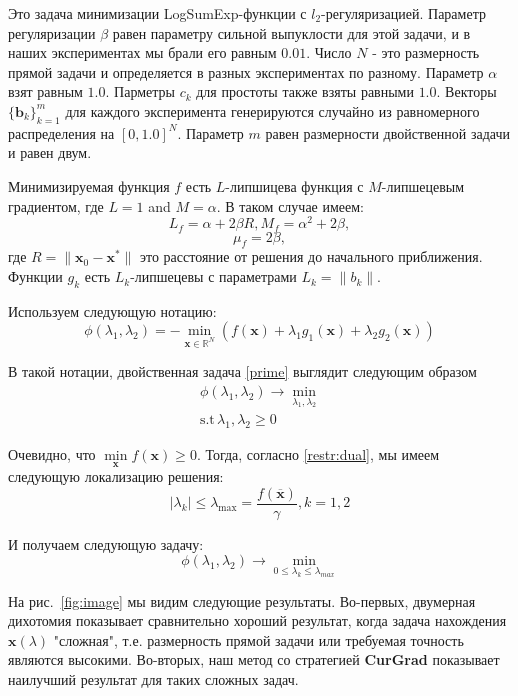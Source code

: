 \documentclass[12pt]{article}
\begin{document}
Это задача минимизации LogSumExp-функции с $l_2$-регуляризацией. Параметр регуляризации $\beta$ равен параметру сильной выпуклости для этой задачи, и в наших экспериментах мы брали его равным $0.01$. Число $N$ - это размерность прямой задачи и определяется  в разных экспериментах по разному. Параметр $\alpha$ взят равным $1.0$. Парметры $c_k$ для простоты также взяты равными $1.0$. Векторы $\{\textbf{b}_k\}_{k=1}^m$ для каждого эксперимента генерируются случайно из равномерного распределения на $[0, 1.0]^N$. Параметр $m$ равен размерности двойственной задачи и равен двум.

Минимизируемая функция $f$ есть $L$-липшицева функция с $M$-липшецевым градиентом, где $L=1$ and $M=\alpha$. В таком случае имеем:
$$L_f = \alpha+2\beta R, M_f = \alpha^2 + 2\beta,$$
$$\mu_f = 2\beta,$$
где $R=\|\textbf{x}_0-\textbf{x}^*\|$ это расстояние от решения до начального приближения. Функции $g_k$ есть $L_k$-липшецевы с параметрами $L_k=\|b_k\|$. 

Используем следующую нотацию:
\begin{equation}
\label{phi}
\phi(\lambda_1, \lambda_2) = -\min\limits_{\textbf{x}\in \mathbb{R}^N}\left(f(\textbf{x}) +\lambda_1 g_1(\textbf{x}) +\lambda_2g_2(\textbf{x})\right)
\end{equation}

В такой нотации, двойственная задача \ref{prime} выглядит следующим образом
\begin{gather}
\phi(\lambda_1, \lambda_2) \rightarrow \min\limits_{\lambda_1, \lambda_2}\\
\text{s.t}\, \lambda_1, \lambda_2 \geq 0
\end{gather}
 
Очевидно, что $\min\limits_{\textbf{x}}f(\textbf{x}) \geq 0$. Тогда, согласно \ref{restr:dual},  мы имеем следующую локализацию решения:
$$|\lambda_k| \leq \lambda_{\text{max}}=\frac{f(\overline{\textbf{x}})}{\gamma}, k=1,2$$

И получаем следующую задачу:
$$\phi(\lambda_1, \lambda_2) \rightarrow \min_{0\leq\lambda_k\leq\lambda_{max}}$$

На рис.~\ref{fig:image} мы видим следующие результаты. Во-первых, двумерная дихотомия показывает сравнительно хороший результат, когда задача нахождения $\textbf{x}(\lambda)$ "сложная", т.е. размерность прямой задачи или требуемая точность являются высокими. Во-вторых, наш метод со стратегией \textbf{CurGrad} показывает наилучший результат для таких сложных задач.
\end{document}
